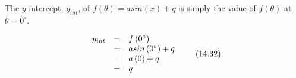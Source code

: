 \par
\label{m39414*uid48}
\nopagebreak
\label{m39414*id86090}The $y$-intercept, ${y}_{int}$, of $f\left(\theta \right)=asin\left(x\right)+q$ is simply the value of $f\left(\theta \right)$ at $\theta ={0}^{\circ }$.\par 
\label{m39414*id86195}\nopagebreak\noindent{}
\begin{equation}
\begin{array}{ccc}\hfill {y}_{int}& =& f\left({0}^{\circ }\right)\hfill \\ & =& asin\left({0}^{\circ }\right)+q\hfill \\ & =& a\left(0\right)+q\hfill \\ & =& q\hfill \end{array}\tag{14.32}
\end{equation}
\label{m39414*secfhsst!!!underscore!!!id2385}
